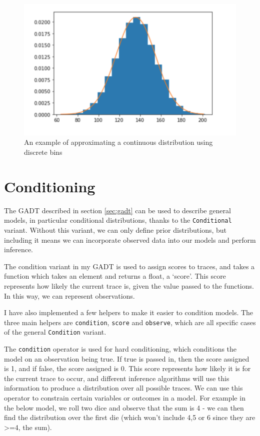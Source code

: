 \begin{figure}[!hb]
	\centering
	\includegraphics[width=\textwidth]{figs/bins.png}
	\caption{An example of approximating a continuous distribution using discrete bins}
	\label{fig:binning}
\end{figure}

\section{Conditioning} \label{sec:condition}

The GADT described in section \ref{sec:gadt} can be used to describe general models, in particular conditional distributions, thanks to the \texttt{Conditional} variant. Without this variant, we can only define prior distributions, but including it means we can incorporate observed data into our models and perform inference.

The condition variant in my GADT is used to assign scores to traces, and takes a function which takes an element and returns a float, a `score'. This score represents how likely the current trace is, given the value passed to the functions. In this way, we can represent observations.
	
I have also implemented a few helpers to make it easier to condition models. The three main helpers are \texttt{condition}, \texttt{score} and \texttt{observe}, which are all specific cases of the general \texttt{Condition} variant. 
	
The \texttt{condition} operator is used for hard conditioning, which conditions the model on an observation being true. If true is passed in, then the score assigned is 1, and if false, the score assigned is 0. This score represents how likely it is for the current trace to occur, and different inference algorithms will use this information to produce a distribution over all possible traces. We can use this operator to constrain certain variables or outcomes in a model. For example in the below model, we roll two dice and observe that the sum is 4 - we can then find the distribution over the first die (which won't include 4,5 or 6 since they are >=4, the sum).
	
